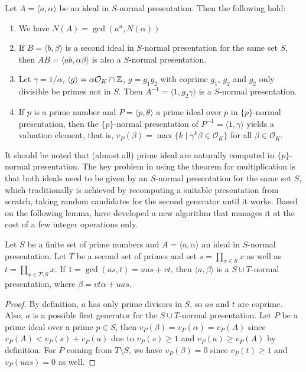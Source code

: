 \documentclass{sig-alternate-05-2015}
\begin{document}
\begin{theorem}
Let $A = \langle a, \alpha \rangle$ be an ideal in $S$-normal presentation. Then the following hold:
\begin{enumerate}
\item We have $N(A) = \gcd(a^n, N(\alpha))$
\item If $B = \langle b, \beta\rangle$ is a second ideal in $S$-normal
presentation for the same set $S$, then
$AB = \langle ab, \alpha\beta\rangle$ is also a $S$-normal presentation.
\item Let $\gamma = 1/\alpha$, $\langle g\rangle = \alpha \mathcal O_K \cap \mathbb{Z}$,
 $g = g_1g_2$ with coprime $g_1$, $g_2$ and $g_2$ only divisible be primes not in $S$. Then $A^{-1} = \langle 1, g_2\gamma\rangle$ is a $S$-normal presentation.
\item If $p$ is a prime number and $P= \langle p, \theta\rangle$ a prime ideal over $p$
in $\{p\}$-normal presentation, then the $\{p\}$-normal presentation
of $P^{-1} = \langle 1, \gamma\rangle$ yields a valuation element, that is,
$v_P(\beta) = \max\{ k \mid \gamma^k\beta\in \mathcal O_K\}$ for all $\beta \in \mathcal O_K$.
\end{enumerate}
\end{theorem}

It should be noted that (almost all) prime ideal are naturally computed
in $\{p\}$-normal presentation. The key problem in using the theorem for
multiplication is that both ideals need to be given by an $S$-normal presentation for
the same set $S$, which traditionally is achieved by recomputing
a suitable presentation from scratch, taking random candidates for the
second generator until it works. Based on the following lemma, have developed a new algorithm that manages it at the cost 
of a few integer operations only.

\begin{lemma}
Let $S$ be a finite set of prime numbers and $A=\langle a, \alpha\rangle$ an ideal in
$S$-normal presentation. Let $T$ be a second set of primes and set
$s = \prod_{x\in S} x$ as well as $t = \prod_{x\in T\setminus S} x$. If $1 = \gcd(as, t) = uas + vt$,
then $\langle a, \beta \rangle$ is a $S\cup T$-normal presentation, where $\beta = vt\alpha + uas$.
\end{lemma}

\begin{proof}
By definition, $a$ has only prime divisors in $S$, so $as$ and $t$ are coprime.
Also, $a$ is a possible first generator for the $S\cup T$-normal presentation.
Let $P$ be a prime ideal over a prime $p\in S$, then
$v_P(\beta) = v_P(\alpha)= v_P(A)$ since $v_P(A) <v_P(s)+v_P(a)$ due to $v_P(s)\ge 1$ and $v_P(a) \ge v_P(A)$ by definition.
For $P$ coming from $T\setminus S$, we have $v_P(\beta) = 0$ since $v_P(t)\ge 1$ and $v_P(uas) = 0$ as well.
\end{proof}
\end{document}
